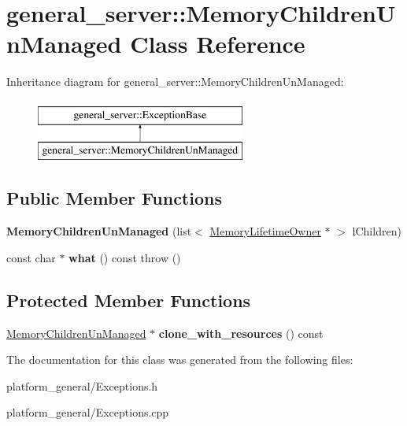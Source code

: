 \hypertarget{classgeneral__server_1_1MemoryChildrenUnManaged}{\section{general\-\_\-server\-:\-:\-Memory\-Children\-Un\-Managed \-Class \-Reference}
\label{classgeneral__server_1_1MemoryChildrenUnManaged}
}
\-Inheritance diagram for general\-\_\-server\-:\-:\-Memory\-Children\-Un\-Managed\-:\begin{figure}[H]
\begin{center}
\leavevmode
\includegraphics[height=2.000000cm]{classgeneral__server_1_1MemoryChildrenUnManaged}
\end{center}
\end{figure}
\subsection*{\-Public \-Member \-Functions}
\begin{DoxyCompactItemize}
\item 
\hypertarget{classgeneral__server_1_1MemoryChildrenUnManaged_adc7a87e8f3d4f72cdee94af074d0f255}{{\bfseries \-Memory\-Children\-Un\-Managed} (list$<$ \hyperlink{classgeneral__server_1_1MemoryLifetimeOwner}{\-Memory\-Lifetime\-Owner} $\ast$ $>$ l\-Children)}\label{classgeneral__server_1_1MemoryChildrenUnManaged_adc7a87e8f3d4f72cdee94af074d0f255}

\item 
\hypertarget{classgeneral__server_1_1MemoryChildrenUnManaged_add908c533449d42b7539ec157d17dde6}{const char $\ast$ {\bfseries what} () const   throw ()}\label{classgeneral__server_1_1MemoryChildrenUnManaged_add908c533449d42b7539ec157d17dde6}

\end{DoxyCompactItemize}
\subsection*{\-Protected \-Member \-Functions}
\begin{DoxyCompactItemize}
\item 
\hypertarget{classgeneral__server_1_1MemoryChildrenUnManaged_ac9f027b2d92a1ac551291e6e21982728}{\hyperlink{classgeneral__server_1_1MemoryChildrenUnManaged}{\-Memory\-Children\-Un\-Managed} $\ast$ {\bfseries clone\-\_\-with\-\_\-resources} () const }\label{classgeneral__server_1_1MemoryChildrenUnManaged_ac9f027b2d92a1ac551291e6e21982728}

\end{DoxyCompactItemize}


\-The documentation for this class was generated from the following files\-:\begin{DoxyCompactItemize}
\item 
platform\-\_\-general/\-Exceptions.\-h\item 
platform\-\_\-general/\-Exceptions.\-cpp\end{DoxyCompactItemize}
